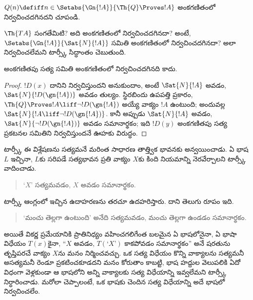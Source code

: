 \documentclass[../../../include/open-logic-section]{subfiles}
\begin{document}
\begin{prob}
$Q(n) \defiff n \in \Setabs{\Gn{!A}}{\Th{Q} \Proves !A}$ అంకగణితంలో
నిర్వచించదగినదని చూపండి.
\end{prob}

$\Th{TA}$ సంగతేమిటి? అది అంకగణితంలో నిర్వచించదగినదా? అంటే,
$\Setabs{\Gn{!A}}{\Sat{N}{!A}}$ సమితి అంకగణితంలో నిర్వచించదగినదా?
అలా నిర్వచించలేమని టార్స్కీ సిద్ధాంతం చెబుతుంది.

\begin{thm}
అంకగణితపు సత్య  సమితి అంకగణితంలో నిర్వచించదగినది కాదు.
\end{thm}

\begin{proof}
$!D(x)$ దానిని నిర్వచిస్తుందని అనుకుందాం, అంటే $\Sat{N}{!A}$ అవడం,
$\Sat{N}{!D(\gn{!A})}$ అవడం తుల్యం. స్థిరబిందు ఉపపత్తి ప్రకారం,
$\Th{Q} \Proves !A \liff \lnot !D(\gn{!A})$ అయ్యే వాక్యం $!A$ ఉంటుంది;
అందువల్ల $\Sat{N}{!A \liff \lnot !D(\gn{!A})}$. కానీ అప్పుడు
$\Sat{N}{!A}$ అవడం, $\Sat{N}{\lnot !D(\gn{!A})}$ అవడం సమానార్థకం;
ఇది $!D(y)$ అంకగణితపు సత్య ప్రకటనల సమితిని నిర్వచిస్తుందనే ఊహకు
విరుద్ధం.
\end{proof}

టార్స్కీ ఈ విశ్లేషణను సత్యమనే మరింత సాధారణ తాత్త్విక భావనకు అన్వయించాడు.
ఏ భాష $L$ ఇచ్చినా, $L$కు సరిపడే సత్యభావన ప్రతి వాక్యం $X$కు కింది నియమాన్ని
నెరవేర్చాలని టార్స్కీ వాదించాడు.
\begin{quote}
`$X$' సత్యమవడం, $X$ అవడం సమానార్థకం.
\end{quote}
టార్స్కీ ఆంగ్లంలో ఇచ్చిన ఉదాహరణను తరచూ ఉదహరిస్తారు. దాని తెలుగు రూపం ఇది.
\begin{quote}
`మంచు తెల్లగా ఉంటుంది' అనేది సత్యమవడం, మంచు తెల్లగా ఉండడం సమానార్థకం.
\end{quote}
అయితే వికర్ణ ప్రమేయానికి ప్రాతినిధ్యం వహించగలిగేంత బలమైన ఏ భాషలోనైనా,
ఏ భాషా విధేయం $T(x)$కైనా, ``$X$ అవడం, $T(\text{`$X$'})$ కాకపోవడం
సమానార్థకం'' అనే షరతును తృప్తిపరచే వాక్యం $X$ను మనం నిర్మించవచ్చు. ఒక సత్య
విధేయం కొన్ని వాక్యాలను సత్యమనీ అసత్యమనీ రెండూ ప్రకటించకూడదని మనం కోరుతాం
కాబట్టి, భాష హద్దుల వెలుపలికి ఏదో విధంగా వెళ్లకుండా ఆ భాషలోని అన్ని
వాక్యాలకు సత్య విధేయాన్ని ఇవ్వలేమని టార్స్కీ నిర్ధారించాడు. మరోలా చెప్పాలంటే,
ఒక భాషకు చెందిన సత్య విధేయాన్ని అదే భాషలో నిర్వచించలేం.
\end{document}
